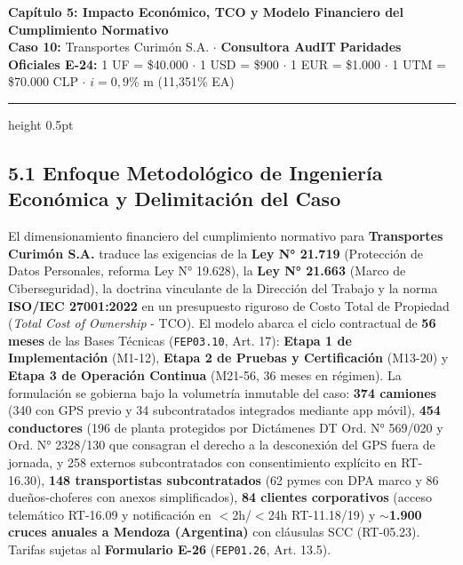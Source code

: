 \documentclass[7.5pt,letterpaper]{article}
\begin{document}
{\color{NavyPrimary}\normalsize\textbf{Capítulo 5: Impacto Económico, TCO y Modelo Financiero del Cumplimiento Normativo}} \\[1.5pt]
{\color{SlateSecondary}\scriptsize\textbf{Caso 10:} Transportes Curimón S.A. $\cdot$ \textbf{Consultora AudIT}} \hfill
{\scriptsize\textbf{Paridades Oficiales E-24:} 1 UF = \$40.000 $\cdot$ 1 USD = \$900 $\cdot$ 1 EUR = \$1.000 $\cdot$ 1 UTM = \$70.000 CLP $\cdot$ $i=0,9\%$ m (11,351\% EA)}
\vspace{1.0pt}
\hrule height 0.5pt
\vspace{2.0pt}

\subsection*{\scriptsize\color{NavyPrimary}5.1 Enfoque Metodológico de Ingeniería Económica y Delimitación del Caso}
\vspace{-4.5pt}
\tiny
El dimensionamiento financiero del cumplimiento normativo para \textbf{Transportes Curimón S.A.} traduce las exigencias de la \textbf{Ley N° 21.719} (Protección de Datos Personales, reforma Ley N° 19.628), la \textbf{Ley N° 21.663} (Marco de Ciberseguridad), la doctrina vinculante de la Dirección del Trabajo y la norma \textbf{ISO/IEC 27001:2022} en un presupuesto riguroso de Costo Total de Propiedad (\textit{Total Cost of Ownership} - TCO). El modelo abarca el ciclo contractual de \textbf{56 meses} de las Bases Técnicas (\texttt{FEP03.10}, Art. 17): \textbf{Etapa 1 de Implementación} (M1-12), \textbf{Etapa 2 de Pruebas y Certificación} (M13-20) y \textbf{Etapa 3 de Operación Continua} (M21-56, 36 meses en régimen). La formulación se gobierna bajo la volumetría inmutable del caso: \textbf{374 camiones} (340 con GPS previo y 34 subcontratados integrados mediante app móvil), \textbf{454 conductores} (196 de planta protegidos por Dictámenes DT Ord. N° 569/020 y Ord. N° 2328/130 que consagran el derecho a la desconexión del GPS fuera de jornada, y 258 externos subcontratados con consentimiento explícito en RT-16.30), \textbf{148 transportistas subcontratados} (62 pymes con DPA marco y 86 dueños-choferes con anexos simplificados), \textbf{84 clientes corporativos} (acceso telemático RT-16.09 y notificación en $<$2h/$<$24h RT-11.18/19) y \textbf{$\sim$1.900 cruces anuales a Mendoza (Argentina)} con cláusulas SCC (RT-05.23). Tarifas sujetas al \textbf{Formulario E-26} (\texttt{FEP01.26}, Art. 13.5).

\vspace{-4.5pt}
\end{document}
